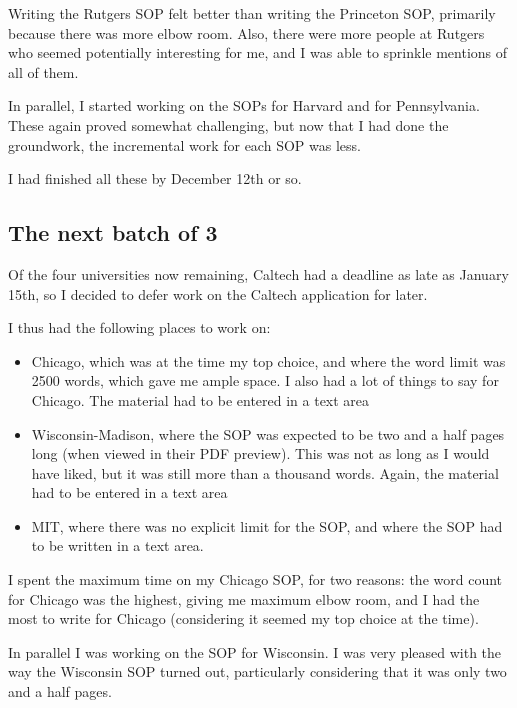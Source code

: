 \documentclass[a4paper]{amsart}
\begin{document}
Writing the Rutgers SOP felt better than writing the Princeton SOP,
primarily because there was more elbow room. Also, there were more
people at Rutgers who seemed potentially interesting for me,
and I was able to sprinkle mentions of all of them.

In parallel, I started working on the SOPs for Harvard and for
Pennsylvania.  These again proved somewhat challenging, but now that I
had done the groundwork, the incremental work for each SOP was less.

I had finished all these by December 12th or so.

\subsection{The next batch of 3}

Of the four universities now remaining, Caltech had a deadline as late
as January 15th, so I decided to defer work on the Caltech application
for later.

I thus had the following places to work on:

\begin{itemize}

\item Chicago, which was at the time my top choice, and where the word
  limit was 2500 words, which gave me ample space. I also had a lot of things
  to say for Chicago. The material had to be entered in a text area

\item Wisconsin-Madison, where the SOP was expected to be two and a
  half pages long (when viewed in their PDF preview). This was not as long
  as I would have liked, but it was still more than a thousand words.
  Again, the material had to be entered in a text area

\item MIT, where there was no explicit limit for the SOP, and where the SOP
  had to be written in a text area.

\end{itemize}

I spent the maximum time on my Chicago SOP, for two reasons: the word
count for Chicago was the highest, giving me maximum elbow room, and
I had the most to write for Chicago (considering it seemed my top choice
at the time).

In parallel I was working on the SOP for Wisconsin. I was very pleased
with the way the Wisconsin SOP turned out, particularly considering that it
was only two and a half pages.
\end{document}
